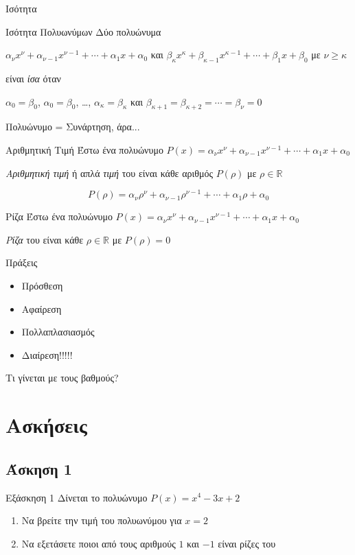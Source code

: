 \documentclass[greek]{beamer}
\begin{document}
\begin{frame}{Ισότητα}
 \begin{block}{Ισότητα Πολυωνύμων}
  Δύο πολυώνυμα

  $α_νx^ν+α_{ν-1}x^{ν-1}+\cdots+α_1x+α_0$ και $β_κx^κ+β_{κ-1}x^{κ-1}+\cdots+β_1x+β_0$ με $ν\ge κ$

  είναι \emph{ίσα} όταν

  $α_0=β_0$, $α_0=β_0$, \ldots, $α_κ=β_κ$ και $β_{κ+1}=β_{κ+2}=\cdots=β_ν=0$
 \end{block}
\end{frame}

\begin{frame}{Πολυώνυμο = Συνάρτηση, άρα...}
 \begin{block}{Αριθμητική Τιμή}
  Έστω ένα πολυώνυμο $P(x)=α_νx^ν+α_{ν-1}x^{ν-1}+\cdots+α_1x+α_0$

  \emph{Αριθμητική τιμή} ή απλά \emph{τιμή} του είναι κάθε αριθμός $P(ρ)$ με $ρ\in\mathbb{R}$

  $$P(ρ)=α_νρ^ν+α_{ν-1}ρ^{ν-1}+\cdots+α_1ρ+α_0$$
 \end{block}

 \begin{block}{Ρίζα}
  Έστω ένα πολυώνυμο $P(x)=α_νx^ν+α_{ν-1}x^{ν-1}+\cdots+α_1x+α_0$

  \emph{Ρίζα} του είναι κάθε $ρ\in\mathbb{R}$ με $P(ρ)=0$
 \end{block}
\end{frame}

\begin{frame}{Πράξεις}
 \begin{block}{}
  \begin{itemize}
   \item<1-> Πρόσθεση
   \item<2-> Αφαίρεση
   \item<3-> Πολλαπλασιασμός
   \item<4-> Διαίρεση!!!!!
  \end{itemize}
 \end{block}
  Τι γίνεται με τους βαθμούς?
\end{frame}

\section{Ασκήσεις}
\subsection{Άσκηση 1}
\begin{frame}[label=Άσκηση1]{Εξάσκηση 1}
 Δίνεται το πολυώνυμο $P(x)=x^4-3x+2$
 \begin{enumerate}
  \item<1-> Να βρείτε την τιμή του πολυωνύμου για $x=2$
  \item<2-> Να εξετάσετε ποιοι από τους αριθμούς $1$ και $-1$ είναι ρίζες του

 \end{enumerate}

\end{frame}
\end{document}
